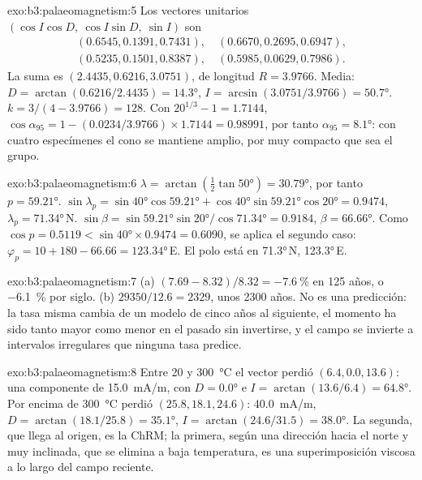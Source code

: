 \begin{solution}{exo:b3:palaeomagnetism:5}
Los vectores unitarios $(\cos I\cos D,\ \cos I\sin D,\ \sin I)$ son
\begin{gather*}
  (0.6545, 0.1391, 0.7431),\quad (0.6670, 0.2695, 0.6947),\\
  (0.5235, 0.1501, 0.8387),\quad (0.5985, 0.0629, 0.7986).
\end{gather*}
La suma es $(2.4435, 0.6216, 3.0751)$, de longitud $R = 3.9766$. Media:
$D = \arctan(0.6216/2.4435) = \ang{14.3}$, $I = \arcsin(3.0751/3.9766) =
\ang{50.7}$. $k = 3/(4 - 3.9766) = 128$. Con $20^{1/3} - 1 = 1.7144$,
$\cos\alpha_{95} = 1 - (0.0234/3.9766)\times1.7144 = 0.98991$, por tanto
$\alpha_{95} = \ang{8.1}$: con cuatro especímenes el cono se mantiene amplio, por muy
compacto que sea el grupo.
\end{solution}

\begin{solution}{exo:b3:palaeomagnetism:6}
\sloppy $\lambda = \arctan(\tfrac12\tan\ang{50}) = \ang{30.79}$, por tanto $p = \ang{59.21}$.
$\sin\lambda_p = \sin\ang{40}\cos\ang{59.21} + \cos\ang{40}\sin\ang{59.21}
\cos\ang{20} = 0.9474$, $\lambda_p = \ang{71.34}$\,N. $\sin\beta =
\sin\ang{59.21}\sin\ang{20}/\cos\ang{71.34} = 0.9184$, $\beta = \ang{66.66}$.
Como $\cos p = 0.5119 < \sin\ang{40}\times0.9474 = 0.6090$, se aplica el segundo caso:
$\varphi_p = 10 + 180 - 66.66 = \ang{123.34}$\,E. El polo está en
\ang{71.3}\,N, \ang{123.3}\,E.
\end{solution}

\begin{solution}{exo:b3:palaeomagnetism:7}
(a) $(7.69 - 8.32)/8.32 = \qty{-7.6}{\percent}$ en 125 años, o
\qty{-6.1}{\percent} por siglo. (b) $29350/12.6 = 2329$, unos 2300 años.
No es una predicción: la tasa misma cambia de un modelo de cinco años al
siguiente, el momento ha sido tanto mayor como menor en el pasado sin
invertirse, y el campo se invierte a intervalos irregulares que ninguna tasa
predice.
\end{solution}

\begin{solution}{exo:b3:palaeomagnetism:8}
Entre 20 y \qty{300}{\celsius} el vector perdió $(6.4, 0.0, 13.6)$: una
componente de \qty{15.0}{mA/m}, con $D = \ang{0.0}$ e
$I = \arctan(13.6/6.4) = \ang{64.8}$. Por encima de \qty{300}{\celsius} perdió $(25.8, 18.1, 24.6)$:
\qty{40.0}{mA/m}, $D = \arctan(18.1/25.8) = \ang{35.1}$, $I =
\arctan(24.6/31.5) = \ang{38.0}$. La segunda, que llega al origen, es la
ChRM; la primera, según una dirección hacia el norte y muy inclinada, que se elimina a baja temperatura,
es una superimposición viscosa a lo largo del campo reciente.
\end{solution}


